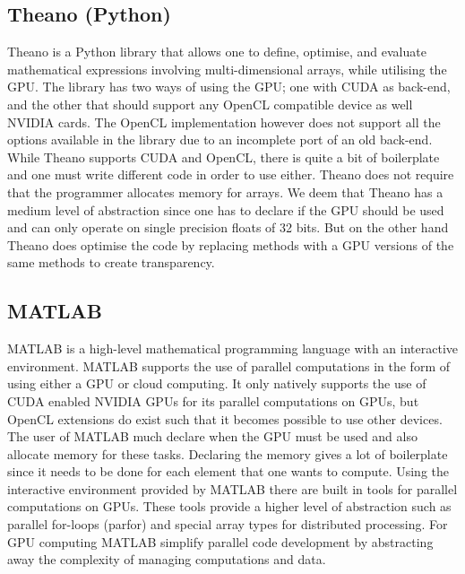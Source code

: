 \subsection{Theano (Python)}
Theano is a Python library that allows one to define, optimise, and evaluate mathematical expressions involving multi-dimensional arrays, while utilising the GPU.
The library has two ways of using the GPU; one with CUDA as back-end, and the other that should support any OpenCL compatible device as well NVIDIA cards.
The OpenCL implementation however does not support all the options available in the library due to an incomplete port of an old back-end.
While Theano supports CUDA and OpenCL, there is quite a bit of boilerplate and one must write different code in order to use either.
Theano does not require that the programmer allocates memory for arrays.
We deem that Theano has a medium level of abstraction since one has to declare if the GPU should be used and can only operate on single precision floats of 32 bits.
But on the other hand Theano does optimise the code by replacing methods with a GPU versions of the same methods to create transparency.\citep{Theano,Theano_GPU}

\subsection{MATLAB}
MATLAB is a high-level mathematical programming language with an interactive environment.
MATLAB supports the use of parallel computations in the form of using either a GPU or cloud computing.
It only natively supports the use of CUDA enabled NVIDIA GPUs for its parallel computations on GPUs, but OpenCL extensions do exist such that it becomes possible to use other devices.
The user of MATLAB much declare when the GPU must be used and also allocate memory for these tasks.
Declaring the memory gives a lot of boilerplate since it needs to be done for each element that one wants to compute.\citep{MATLAB_backend,MATLAB_benchmark}
Using the interactive environment provided by MATLAB there are built in tools for parallel computations on GPUs.
These tools provide a higher level of abstraction such as parallel for-loops (parfor) and special array types for distributed processing.
For GPU computing MATLAB simplify parallel code development by abstracting away the complexity of managing computations and data.\citep{MATLAB_parallel}

